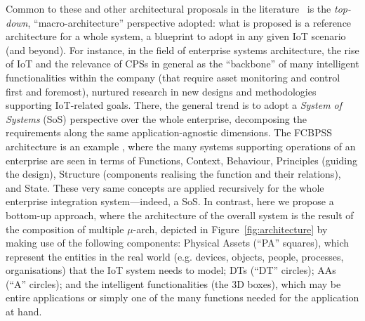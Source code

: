 Common to these and other architectural proposals in the literature~\cite{iiot_dt_architectural_aspects,guinard2010resource,laghari-2016,Guth2016,Cavalcante2015} is the \emph{top-down}, ``macro-architecture'' perspective adopted: what is proposed is a reference architecture for a whole system, a blueprint to adopt in any given IoT scenario (and beyond).
%
For instance, in the field of enterprise systems architecture, the rise of IoT and the relevance of CPSs in general as the ``backbone'' of many intelligent functionalities within the company (that require asset monitoring and control first and foremost), nurtured research in new designs and methodologies supporting IoT-related goals. 
There, the general trend is to adopt a \emph{System of Systems} (SoS) perspective over the whole enterprise, decomposing the requirements along the same application-agnostic dimensions. 
The FCBPSS architecture is an example \cite{DBLP:journals/eis/WangWDFKIZ16}, where the many systems supporting operations of an enterprise are seen in terms of Functions, Context, Behaviour, Principles (guiding the design), Structure (components realising the function and their relations), and State. 
These very same concepts are applied recursively for the whole enterprise integration system---indeed, a SoS.
%
In contrast, here we propose a bottom-up approach, where the architecture of the overall system is the result of the composition of multiple $\mu$-arch, depicted in Figure~\ref{fig:architecture} by making use of the following components: 
%
Physical Assets (``PA'' squares), which represent the entities in the real world (e.g. devices, objects, people, processes, organisations) that the IoT system needs to model; 
DTs (``DT'' circles); 
AAs (``A'' circles); 
and the intelligent functionalities (the 3D boxes), which may be entire applications or simply one of the many functions needed for the application at hand. 
